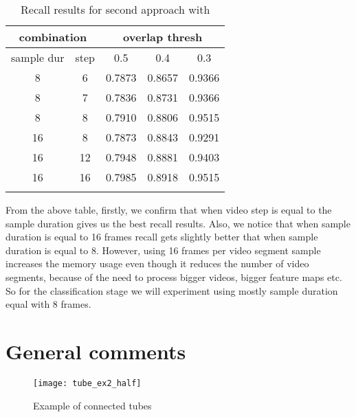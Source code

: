 \begin{center}
\begin{longtable}{||c c||c c c||}

  \hline
  \multicolumn{2}{||c||}{\textbf{combination}} &\multicolumn{3}{|c||}{\textbf{overlap thresh}}\\
  \hline
  sample dur & step &  0.5  &  0.4 &  0.3 \\
  \hline   \hline

  8 & 6 & 0.7873 & 0.8657 & 0.9366  \\
  \hline
  8 & 7 & 0.7836 & 0.8731 & 0.9366  \\
  \hline
  8 &  8 & 0.7910 & 0.8806 & 0.9515 \\
  \hline 

  16 & 8  & 0.7873 & 0.8843 & 0.9291 \\
  \hline
  16 & 12 & 0.7948 & 0.8881 & 0.9403 \\
  \hline
  16 & 16 & 0.7985 & 0.8918 & 0.9515 \\
  \hline \hline
  \caption{Recall results for second approach with  }
  \label{table:conn_app3}
\end{longtable} 
\end{center}

From the above table, firstly, we confirm that when video step is equal to the sample duration gives us the best recall results.
Also, we notice that when sample duration is equal to 16  frames recall gets slightly better that when sample duration is
equal to 8. However, using  16 frames per video segment sample increases the memory usage even though it reduces the number of video segments, because of the
need to process bigger videos, bigger feature maps etc. So for the classification stage we will experiment using mostly sample duration equal
with 8 frames.

\section {General comments}

\begin{figure}[h]
  \centering
  \texttt{[image: tube\_ex2\_half]}
  \caption{Example of connected tubes}
  \label{fig:tube_ex}
\end{figure}

